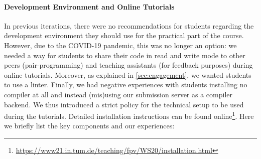 \paragraph{Development Environment and Online Tutorials}
In previous iterations,
there were no recommendations for students regarding the development environment they should use for the practical part of the course.
However, due to the COVID-19 pandemic,
this was no longer an option:
we needed a way for students to share their code in read and write mode
to other peers (pair-programming) and teaching assistants (for feedback purposes) during online tutorials.
Moreover, as explained in \cref{sec:engagement},
we wanted students to use a linter.
Finally, we had negative experiences with students
installing no compiler at all
and instead (mis)using our submission server as a compiler backend.
We thus introduced a strict policy
for the technical setup to be used during
the tutorials.
Detailed installation instructions can be found online\footnote{\url{https://www21.in.tum.de/teaching/fpv/WS20/installation.html}}.
Here we briefly list the key components and our experiences:
